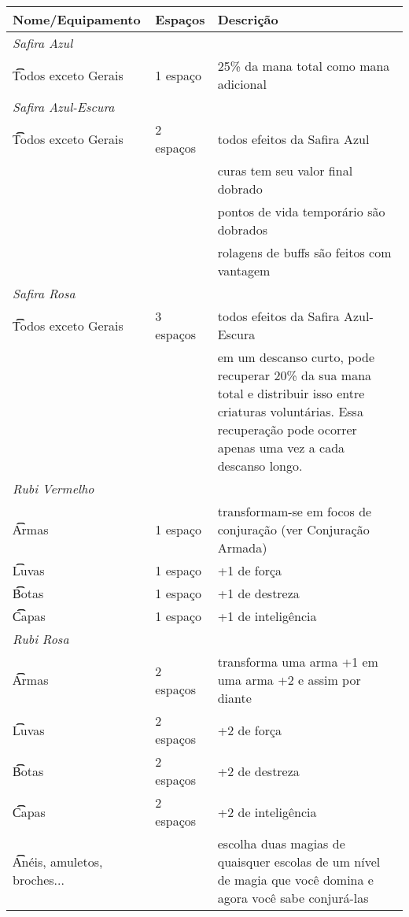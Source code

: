 \begin{center}
\begin{longtable}{ m{6cm} m{2cm} m{8cm} }
    \textbf{Nome/Equipamento} & \textbf{Espaços} & \textbf{Descrição} \\

    \hline \hline \hline \hline

    \multicolumn{2}{l}{\t\textit{Safira Azul}} \\
    \t\t Todos exceto Gerais & 1 espaço & 25\% da mana total como mana adicional
    \\
    \hline \hline

    \multicolumn{2}{l}{\t\textit{Safira Azul-Escura}} \\
    \t\t Todos exceto Gerais & 2 espaços & todos efeitos da Safira Azul \\
    && curas tem seu valor final dobrado \\
    && pontos de vida temporário são dobrados \\
    && rolagens de buffs são feitos com vantagem \\
    \hline \hline

    \multicolumn{2}{l}{\t\textit{Safira Rosa}} \\
    \t\t Todos exceto Gerais & 3 espaços & todos efeitos da Safira Azul-Escura \\
    && em um descanso curto, pode recuperar 20\% da sua mana total e
    distribuir isso entre criaturas voluntárias. Essa recuperação pode
    ocorrer apenas uma vez a cada descanso longo. \\

    \hline \hline \hline \hline

    \multicolumn{2}{l}{\t\textit{Rubi Vermelho}} \\
    \t\t Armas & 1 espaço & transformam-se em focos de conjuração (ver
    Conjuração Armada) \\ \hline
    \t\t Luvas & 1 espaço & +1 de força \\ \hline
    \t\t Botas & 1 espaço & +1 de destreza \\ \hline
    \t\t Capas & 1 espaço & +1 de inteligência \\
    \hline \hline

    \multicolumn{2}{l}{\t\textit{Rubi Rosa}} \\
    \t\t Armas & 2 espaços & transforma uma arma +1 em uma arma +2 e assim por
    diante\\ \hline
    \t\t Luvas & 2 espaços & +2 de força \\ \hline
    \t\t Botas & 2 espaços & +2 de destreza \\ \hline
    \t\t Capas & 2 espaços & +2 de inteligência \\ \hline
    \t\t Anéis, amuletos, broches... && escolha duas magias de quaisquer
    escolas de um nível de magia que você domina e agora você sabe
    conjurá-las \\
    \hline \hline


\end{longtable}
\end{center}
